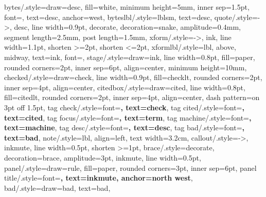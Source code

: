{  bytes/.style={draw=desc, fill=white, minimum height=5mm, inner sep=1.5pt,
    font=\scriptsize\ttfamily, text=desc, anchor=west},
  byteslbl/.style={lblsm, text=desc},
  quote/.style={->, desc, line width=0.9pt, decorate,
    decoration={snake, amplitude=0.4mm, segment length=2.5mm, post length=1.5mm}},
  xform/.style={->, ink, line width=1.1pt, shorten >=2pt, shorten <=2pt},
  xformlbl/.style={lbl, above, midway, text=ink, font=\footnotesize\sffamily\bfseries},
  stage/.style={draw=ink, line width=0.8pt, fill=paper, rounded corners=2pt,
    inner sep=6pt, align=center, minimum height=10mm},
  checked/.style={draw=check, line width=0.9pt, fill=checklt, rounded corners=2pt,
    inner sep=4pt, align=center},
  citedbox/.style={draw=cited, line width=0.8pt, fill=citedlt, rounded corners=2pt,
    inner sep=4pt, align=center, dash pattern=on 3pt off 1.5pt},
  tag check/.style={font=\scriptsize\sffamily\bfseries, text=check},
  tag cited/.style={font=\scriptsize\sffamily\bfseries, text=cited},
  tag focus/.style={font=\scriptsize\sffamily\bfseries, text=term},
  tag machine/.style={font=\scriptsize\sffamily\bfseries, text=machine},
  tag desc/.style={font=\scriptsize\sffamily\bfseries, text=desc},
  tag bad/.style={font=\scriptsize\sffamily\bfseries, text=bad},
  note/.style={lbl, align=left, text width=3.2cm},
  callout/.style={->, inkmute, line width=0.5pt, shorten >=1pt},
  brace/.style={decorate, decoration={brace, amplitude=3pt}, inkmute, line width=0.5pt},
  panel/.style={draw=rule, fill=paper, rounded corners=3pt, inner sep=6pt},
  panel title/.style={font=\footnotesize\sffamily\bfseries, text=inkmute, anchor=north west},
  bad/.style={draw=bad, text=bad},
}


\setlength{\textfloatsep}{14pt plus 2pt minus 2pt}
\setlength{\intextsep}{12pt plus 2pt minus 2pt}

